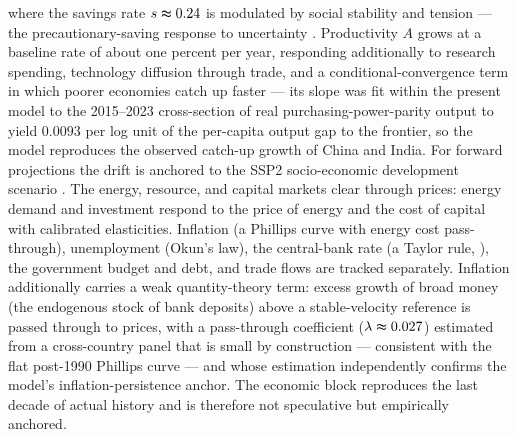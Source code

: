 \documentclass[a4paper,fleqn]{cas-sc}
\begin{document}
where the savings rate $s\thickapprox 0.24$ is modulated by social stability and tension --- the precautionary-saving response to uncertainty \citep{mody2012}. Productivity $A$ grows at a baseline rate of about one percent per year, responding additionally to research
spending, technology diffusion through trade, and a conditional-convergence term in which poorer economies catch up faster --- its slope was fit within the present model to the 2015--2023 cross-section of real purchasing-power-parity output to yield $0.0093$ per log unit of the per-capita output gap to the frontier, so the model reproduces the observed catch-up growth of China and India. For forward projections the drift is anchored to the SSP2 socio-economic development scenario \citep{riahi2017}. The energy, resource, and capital markets clear through prices: energy demand and investment respond to the price of energy and the cost of capital with calibrated elasticities.
Inflation (a Phillips curve with energy cost pass-through), unemployment (Okun's law), the
central-bank rate (a Taylor rule, \citep{taylor1993}), the government budget and debt, and trade
flows are tracked separately. Inflation additionally carries a weak quantity-theory term: excess
growth of broad money (the endogenous stock of bank deposits) above a stable-velocity reference is
passed through to prices, with a pass-through coefficient ($\lambda\thickapprox0.027$) estimated from a
cross-country panel that is small by construction --- consistent with the flat post-1990 Phillips
curve --- and whose estimation independently confirms the model's inflation-persistence anchor. The
economic block reproduces the last decade of actual history and is
therefore not speculative but empirically anchored.
\end{document}
